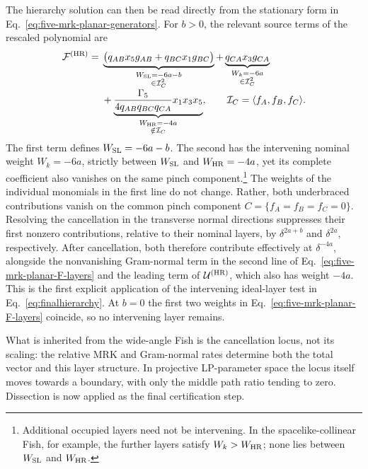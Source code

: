 \documentclass[a4paper,11pt]{article}
\begin{document}
The hierarchy solution can then be read directly from the stationary form in
Eq.~\eqref{eq:five-mrk-planar-generators}.  For \(b>0\), the relevant source
terms of the rescaled polynomial are
\begin{align}
 \mathcal F^{(\rm HR)}={}&
 \underbrace{\bigl(q_{AB}x_5g_{AB}+q_{BC}x_1g_{BC}\bigr)}_{
             \substack{W_{\rm SL}=-6a-b\\ \in\mathcal I_C^2}}
 +\underbrace{q_{CA}x_3g_{CA}}_{
             \substack{W_k=-6a\\ \in\mathcal I_C^2}}
 \nonumber\\[-1mm]
 &+\underbrace{
 \frac{\Gamma_5}{4q_{AB}q_{BC}q_{CA}}x_1x_3x_5}_{
 \substack{W_{\rm HR}=-4a\\ \notin\mathcal I_C}},
 \qquad
 \mathcal I_C=\langle f_A,f_B,f_C\rangle.
 \label{eq:five-mrk-planar-F-layers}
\end{align}
The first term defines \(W_{\rm SL}=-6a-b\).  The second has the intervening
nominal weight \(W_k=-6a\), strictly between \(W_{\rm SL}\) and
\(W_{\rm HR}=-4a\), yet its complete coefficient also vanishes on the same
pinch component.\footnote{Additional occupied layers need not be
intervening.  In the spacelike-collinear Fish, for example, the further
layers satisfy \(W_k>W_{\rm HR}\); none lies between \(W_{\rm SL}\) and
\(W_{\rm HR}\).}  The weights of the individual monomials in the first line
do not change.  Rather, both underbraced contributions vanish on the common
pinch component \(C=\{f_A=f_B=f_C=0\}\).  Resolving the cancellation in the
transverse normal directions suppresses their first nonzero contributions,
relative to their nominal layers, by \(\delta^{2a+b}\) and \(\delta^{2a}\),
respectively.  After cancellation, both therefore contribute effectively at
\(\delta^{-4a}\), alongside the nonvanishing Gram-normal term in the second line of
Eq.~\eqref{eq:five-mrk-planar-F-layers} and the leading term of
\(\mathcal U^{(\rm HR)}\), which also has weight \(-4a\).  This is the first
explicit application of the intervening ideal-layer test in
Eq.~\eqref{eq:finalhierarchy}.  At \(b=0\) the
first two weights in Eq.~\eqref{eq:five-mrk-planar-F-layers} coincide, so no
intervening layer remains.

What is inherited from the wide-angle Fish is the cancellation locus, not
its scaling: the relative MRK and Gram-normal rates determine both the total
vector and this layer structure.  In projective LP-parameter space the locus
itself moves towards a boundary, with only the middle path ratio tending to
zero.  Dissection is now applied as the final certification step.
\end{document}
